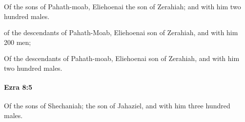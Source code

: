 			\begin{versebox}
					\item[BHS] 
					\item[LXX] 
					\item[ASV] Of the sons of Pahath-moab, Eliehoenai the son of Zerahiah; and with him two hundred males.
					\item[NIV] of the descendants of Pahath-Moab, Eliehoenai son of Zerahiah, and with him 200 men;
					\item[NRSV] Of the descendants of Pahath-moab, Eliehoenai son of Zerahiah, and with him two hundred males.
			\end{versebox}

		\paragraph{Ezra 8:5} %
			\label{EZRA-8-5}

			Of the sons of Shechaniah; the son of Jahaziel, and with him three hundred males.

